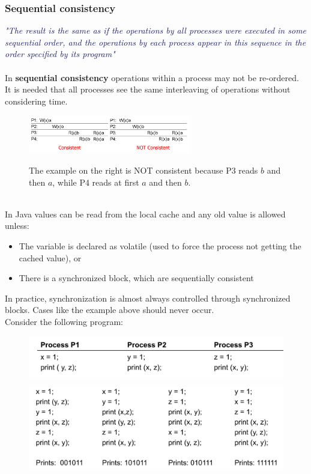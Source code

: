 \documentclass[10pt,a4paper]{article}
\newcommand{\mydefinition}[1]{\textcolor{MidnightBlue}{\textit{"#1"}\\ \\}}
\begin{document}
\subsubsection{Sequential consistency}
\mydefinition{The result is the same as if the operations by all processes were executed in some sequential order, and the operations by each process appear in this sequence in the order specified by its program}
In \textbf{sequential consistency} operations within a process may not be re-ordered. It is needed that all processes see the same interleaving of operations without considering time.
\begin{figure}[h!]
 \hfill \includegraphics[width=200pt]{images/sequential.png}\hspace*{\fill}
  \label{fig:sequential}
  \caption{The example on the right is NOT consistent because P3 reads $b$ and then $a$, while P4 reads at first $a$ and then $b$.}
\end{figure} \\
In Java values can be read from the local cache and any old value is allowed unless:
\begin{itemize}
	\item The variable is declared as volatile (used to force the process not getting the cached value), or
	\item There is a synchronized block, which are sequentially consistent
\end{itemize}
In practice, synchronization is almost always controlled through synchronized blocks. Cases like the example above should never occur. \\
Consider the following program:
\begin{figure}[h!]
\centering
\begin{minipage}{.5\textwidth}
  \centering
  \includegraphics[width=.9\linewidth]{images/sequentially1.png}
  \label{fig:sequentially1}
\end{minipage}%
\begin{minipage}{.5\textwidth}
  \centering
  \includegraphics[width=.9\linewidth]{images/sequentially2.png}
  \label{fig:sequentially2}
\end{minipage}
\end{figure} 
\end{document}
